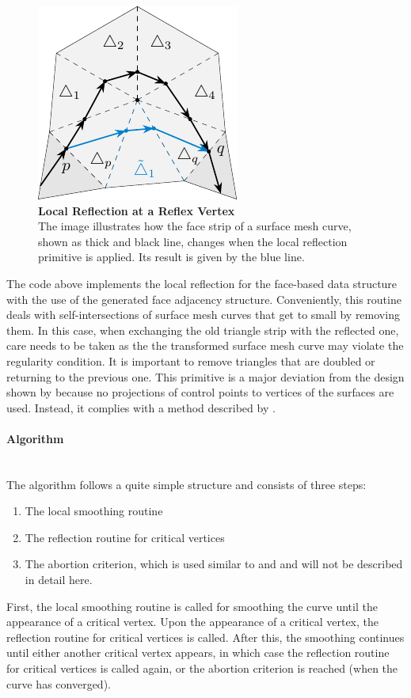 \documentclass{stdlocal}
\begin{document}
  \begin{figure}
    \centering
    \includegraphics[width=0.45\linewidth]{figures/local-reflection.pdf}
    \caption[Local Reflection at a Reflex Vertex]{%
      \textbf{Local Reflection at a Reflex Vertex}\\
      The image illustrates how the face strip of a surface mesh curve, shown as thick and black line, changes when the local reflection primitive is applied.
      Its result is given by the blue line.
    }
    \label{fig:local-reflection}
  \end{figure}

  The code above implements the local reflection for the face-based data structure with the use of the generated face adjacency structure.
  Conveniently, this routine deals with self-intersections of surface mesh curves that get to small by removing them.
  In this case, when exchanging the old triangle strip with the reflected one, care needs to be taken as the the transformed surface mesh curve may violate the regularity condition.
  It is important to remove triangles that are doubled or returning to the previous one.
  This primitive is a major deviation from the design shown by \textcite{lawonn2014} because no projections of control points to vertices of the surfaces are used.
  Instead, it complies with a method described by \textcite{mancinelli2022}.

  \paragraph{Algorithm}\hfill\\
  The algorithm follows a quite simple structure and consists of three steps:
  \begin{enumerate}
    \item The local smoothing routine
    \item The reflection routine for critical vertices
    \item The abortion criterion, which is used similar to \textcite{martinez2005} and \textcite{lawonn2014} and will not be described in detail here.
  \end{enumerate}
  First, the local smoothing routine is called for smoothing the curve until the appearance of a critical vertex.
  Upon the appearance of a critical vertex, the reflection routine for critical vertices is called.
  After this, the smoothing continues until either another critical vertex appears, in which case the reflection routine for critical vertices is called again, or the abortion criterion is reached (when the curve has converged).
\end{document}
